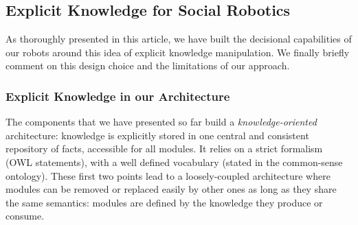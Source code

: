 \documentclass[preprint,3p,times]{elsarticle}
\newcommand{\eg}{e.g.\xspace}
\begin{document}
%
%


\subsection{Explicit Knowledge for Social Robotics}
\label{krs-discussion}

As thoroughly presented in this article, we have built the decisional
capabilities of our robots around this idea of explicit knowledge manipulation.
We finally briefly comment on this design choice and the limitations of our
approach.

\subsubsection{Explicit Knowledge in our Architecture}

The components that we have presented so far build a \emph{knowledge-oriented}
architecture: knowledge is explicitly stored in one central and consistent
repository of facts, accessible for all modules. It relies on a strict formalism
(OWL statements), with a well defined vocabulary (stated in the common-sense
ontology). These first two points lead to a loosely-coupled architecture
where modules can be removed or replaced easily by other ones as long as they
share the same semantics: modules are defined by the knowledge they produce or
consume.
\end{document}
